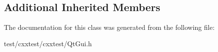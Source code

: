 \subsection*{Additional Inherited Members}


The documentation for this class was generated from the following file\-:\begin{DoxyCompactItemize}
\item 
test/cxxtest/cxxtest/Qt\-Gui.\-h\end{DoxyCompactItemize}

